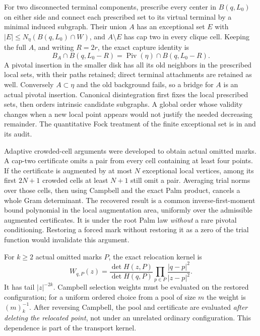 \documentclass[11pt,a4paper]{article}
\theoremstyle{definition}
\theoremstyle{remark}
\numberwithin{equation}{section}
\begin{document}
For two disconnected terminal components, prescribe every center in
$B(q,L_0)$ on either side and connect each prescribed set to its
virtual terminal by a minimal induced subgraph. Their union $A$ has
an exceptional set $E$ with
$|E|\le N_\eta(B(q,L_0)\cap W)$, and $A\setminus E$ has cap two
in every clique cell. Keeping the full $A$, and writing
$R=2r$, the exact capture identity is
\begin{equation}\label{br:local-capture}
 B_A\cap B(q,L_0-R)
       =\operatorname{Piv}(\eta)\cap B(q,L_0-R).
\end{equation}
A pivotal insertion in the smaller disk has all its old neighbors
in the prescribed local sets, with their paths retained; direct
terminal attachments are retained as well. Conversely $A\subset\eta$
and the old background fails, so a bridge for $A$ is an actual
pivotal insertion.
Canonical disintegration first fixes the local prescribed sets,
then orders intrinsic candidate subgraphs. A global order whose
validity changes when a new local point appears would not justify
the needed decreasing remainder. The quantitative Fock treatment of
the finite exceptional set is in
 and its audit.

Adaptive crowded-cell arguments were developed to obtain actual omitted
marks.  A cap-two certificate omits a pair from every cell containing at
least four points.  If the certificate is augmented by at most $N$
exceptional local vertices, among its first $2N+1$ crowded cells at least
$N+1$ still omit a pair.  Averaging trial norms over those cells, then
using Campbell and the exact Palm product, cancels a whole Gram
determinant.  The recovered result is a common inverse-first-moment
bound polynomial in the local augmentation area, uniformly over the
admissible augmented certificates.  It is under the root Palm law
\emph{without} a rare pivotal conditioning.  Restoring a forced mark
without restoring it as a zero of the trial function would invalidate
this argument.

For $k\geq2$ actual omitted marks $P$, the exact relocation kernel is
\[
 W_{q,P}(z)=\frac{\det H(z,P)}{\det H(q,P)}
        \prod_{p\in P}\frac{|q-p|^2}{|z-p|^2}.
\]
It has tail $|z|^{-2k}$.  Campbell selection weights must be evaluated
on the restored configuration; for a uniform ordered choice from a
pool of size $m$ the weight is $(m)_k^{-1}$.  After reversing Campbell,
the pool and certificate are evaluated \emph{after deleting the
relocated point}, not under an unrelated ordinary configuration.
This dependence is part of the transport kernel.
\end{document}
